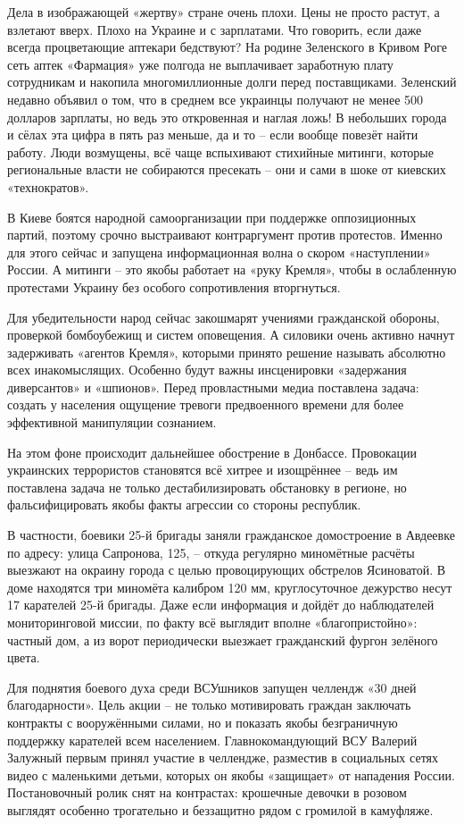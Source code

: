 Дела в изображающей «жертву» стране очень плохи. Цены не просто растут, а
взлетают вверх. Плохо на Украине и с зарплатами. Что говорить, если даже всегда
процветающие аптекари бедствуют? На родине Зеленского в Кривом Роге сеть аптек
«Фармация» уже полгода не выплачивает заработную плату сотрудникам и накопила
многомиллионные долги перед поставщиками. Зеленский недавно объявил о том, что
в среднем все украинцы получают не менее 500 долларов зарплаты, но ведь это
откровенная и наглая ложь! В небольших города и сёлах эта цифра в пять раз
меньше, да и то – если вообще повезёт найти работу. Люди возмущены, всё чаще
вспыхивают стихийные митинги, которые региональные власти не собираются
пресекать – они и сами в шоке от киевских «технократов». 

В Киеве боятся народной самоорганизации при поддержке оппозиционных партий,
поэтому срочно выстраивают контраргумент против протестов. Именно для этого
сейчас и запущена информационная волна о скором «наступлении» России. А митинги
– это якобы работает на «руку Кремля», чтобы в ослабленную протестами Украину
без особого сопротивления вторгнуться. 

Для убедительности народ сейчас закошмарят учениями гражданской обороны,
проверкой бомбоубежищ и систем оповещения. А силовики очень активно начнут
задерживать «агентов Кремля», которыми принято решение называть абсолютно всех
инакомыслящих. Особенно будут важны инсценировки «задержания диверсантов» и
«шпионов». Перед провластными медиа поставлена задача: создать у населения
ощущение тревоги предвоенного времени для более эффективной манипуляции
сознанием. 

На этом фоне происходит дальнейшее обострение в Донбассе. Провокации украинских
террористов становятся всё хитрее и изощрённее – ведь им поставлена задача не
только дестабилизировать обстановку в регионе, но фальсифицировать якобы факты
агрессии со стороны республик. 

В частности, боевики 25-й бригады заняли гражданское домостроение в Авдеевке по
адресу: улица Сапронова, 125, – откуда регулярно миномётные расчёты выезжают на
окраину города с целью провоцирующих обстрелов Ясиноватой. В доме находятся три
миномёта калибром 120 мм, круглосуточное дежурство несут 17 карателей 25-й
бригады. Даже если информация и дойдёт до наблюдателей мониторинговой миссии,
по факту всё выглядит вполне «благопристойно»: частный дом, а из ворот
периодически выезжает гражданский фургон зелёного цвета. 

Для поднятия боевого духа среди ВСУшников запущен челлендж «30 дней
благодарности». Цель акции – не только мотивировать граждан заключать контракты
с вооружёнными силами, но и показать якобы безграничную поддержку карателей
всем населением. Главнокомандующий ВСУ Валерий Залужный первым принял участие в
челлендже, разместив в социальных сетях видео с маленькими детьми, которых он
якобы «защищает» от нападения России. Постановочный ролик снят на контрастах:
крошечные девочки в розовом выглядят особенно трогательно и беззащитно рядом с
громилой в камуфляже. 

